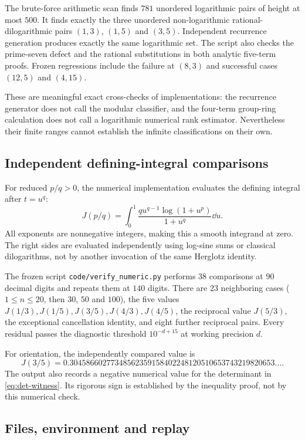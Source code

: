 The brute-force arithmetic scan finds $781$ unordered logarithmic pairs
of height at most $500$. It finds exactly the three unordered
non-logarithmic rational-dilogarithmic pairs $(1,3)$, $(1,5)$ and
$(3,5)$. Independent recurrence generation produces exactly the same
logarithmic set. The script also checks the prime-seven defect and the
rational substitutions in both analytic five-term proofs. Frozen
regressions include the failure at $(8,3)$ and successful cases
$(12,5)$ and $(4,15)$.

These are meaningful exact cross-checks of implementations: the
recurrence generator does not call the modular classifier, and the
four-term group-ring calculation does not call a logarithmic numerical
rank estimator. Nevertheless their finite ranges cannot establish the
infinite classifications on their own.

\subsection{Independent defining-integral comparisons}

For reduced $p/q>0$, the numerical implementation evaluates the defining
integral after $t=u^q$:
\begin{equation}\label{eq:numeric-integral}
 J(p/q)=\int_0^1
       \frac{q u^{q-1}\log(1+u^p)}{1+u^q}\dd u.
\end{equation}
All exponents are nonnegative integers, making this a smooth integrand
at zero. The right sides are evaluated independently using log-sine
sums or classical dilogarithms, not by another invocation of the same
Herglotz identity.

The frozen script \nolinkurl{code/verify_numeric.py} performs $38$
comparisons at $90$ decimal digits and repeats them at $140$ digits.
There are $23$ neighboring cases ($1\le n\le20$, then $30$, $50$ and
$100$), the five values $J(1/3),J(1/5),J(3/5),J(4/3),J(4/5)$, the
reciprocal value $J(5/3)$, the exceptional cancellation identity, and
eight further reciprocal pairs. Every residual passes the diagnostic
threshold $10^{-d+15}$ at working precision $d$.

For orientation, the independently compared value is
\[
 J(3/5)=0.30458660277348562359158402248120510653743219820653\ldots.
\]
The output also records a negative numerical value for the determinant
in \eqref{eq:det-witness}. Its rigorous sign is established by the
inequality proof, not by this numerical check.

\subsection{Files, environment and replay}


